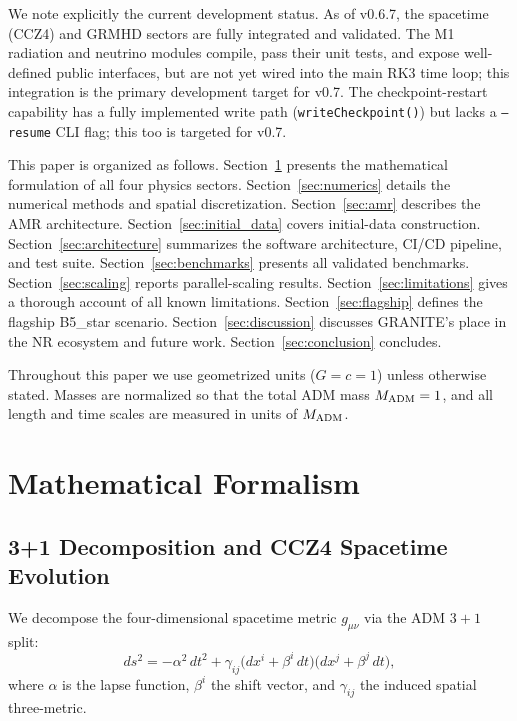 \documentclass[aps,prd,twocolumn,superscriptaddress,nofootinbib,showpacs,
               longbibliography]{revtex4-2}
\newcommand{\code}[1]{\texttt{#1}}
\begin{document}
We note explicitly the current development status.
As of v0.6.7, the spacetime (CCZ4) and GRMHD sectors are fully integrated
and validated.
The M1 radiation and neutrino modules compile, pass their unit tests, and
expose well-defined public interfaces, but are not yet wired into the main
RK3 time loop; this integration is the primary development target for v0.7.
The checkpoint-restart capability has a fully implemented write path
(\code{writeCheckpoint()}) but lacks a \code{--resume} CLI flag; this too is
targeted for v0.7.

This paper is organized as follows.
Section~\ref{sec:formalism} presents the mathematical formulation of all
four physics sectors.
Section~\ref{sec:numerics} details the numerical methods and spatial
discretization.
Section~\ref{sec:amr} describes the AMR architecture.
Section~\ref{sec:initial_data} covers initial-data construction.
Section~\ref{sec:architecture} summarizes the software architecture, CI/CD
pipeline, and test suite.
Section~\ref{sec:benchmarks} presents all validated benchmarks.
Section~\ref{sec:scaling} reports parallel-scaling results.
Section~\ref{sec:limitations} gives a thorough account of all known
limitations.
Section~\ref{sec:flagship} defines the flagship B5\_star scenario.
Section~\ref{sec:discussion} discusses GRANITE's place in the NR ecosystem
and future work.
Section~\ref{sec:conclusion} concludes.

Throughout this paper we use geometrized units ($G = c = 1$) unless
otherwise stated.
Masses are normalized so that the total ADM mass $M_{\rm ADM} = 1$,
and all length and time scales are measured in units of $M_{\rm ADM}$.

\section{Mathematical Formalism}
\label{sec:formalism}

\subsection{3+1 Decomposition and CCZ4 Spacetime Evolution}
\label{sec:ccz4_formalism}

We decompose the four-dimensional spacetime metric $g_{\mu\nu}$ via the
ADM $3+1$ split:
\begin{equation}
  ds^2 = -\alpha^2\,dt^2
       + \gamma_{ij}\bigl(dx^i + \beta^i\,dt\bigr)
                    \bigl(dx^j + \beta^j\,dt\bigr),
  \label{eq:adm}
\end{equation}
where $\alpha$ is the lapse function, $\beta^i$ the shift vector, and
$\gamma_{ij}$ the induced spatial three-metric.
\end{document}
